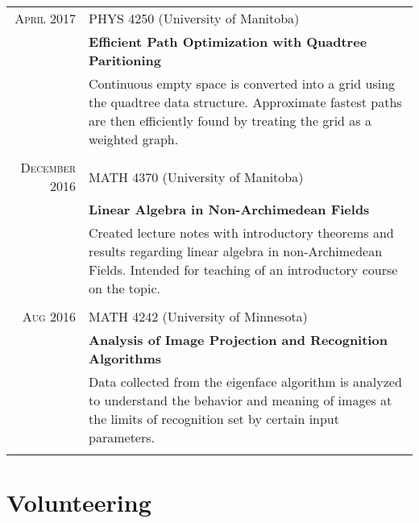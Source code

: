 \documentclass[letter,10pt]{article} %
\begin{document}
\begin{tabular}{r|p{9.5cm}}
\textsc{April} 2017 & PHYS 4250 (University of Manitoba) \\
& \textbf{Efficient Path Optimization with Quadtree Paritioning} \\
& \footnotesize{Continuous empty space is converted into a grid using the quadtree data structure. Approximate fastest paths are then efficiently found by treating the grid as a weighted graph.}\\
\multicolumn{2}{c}{} \\


\textsc{December} 2016 & MATH 4370 (University of Manitoba) \\
& \textbf{Linear Algebra in Non-Archimedean Fields} \\
& \footnotesize{Created lecture notes with introductory theorems and results regarding linear algebra in non-Archimedean Fields. Intended for teaching of an introductory course on the topic.}\\
\multicolumn{2}{c}{} \\


\textsc{Aug} 2016 & MATH 4242 (University of Minnesota) \\
& \textbf{Analysis of Image Projection and Recognition Algorithms} \\
& \footnotesize{Data collected from the eigenface algorithm is analyzed to understand the behavior and meaning of images at the limits of recognition set by certain input parameters.}\\
\multicolumn{2}{c}{} \\
\end{tabular}


\section{Volunteering}
\end{document}

